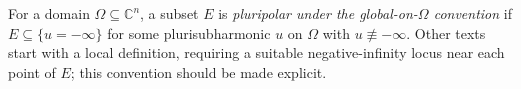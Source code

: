 
For a domain $\Omega\subseteq\mathbb C^n$, a subset $E$ is \emph{pluripolar under the global-on-$\Omega$ convention} if $E\subseteq\{u=-\infty\}$ for some plurisubharmonic $u$ on $\Omega$ with $u\not\equiv-\infty$. Other texts start with a local definition, requiring a suitable negative-infinity locus near each point of $E$; this convention should be made explicit.
